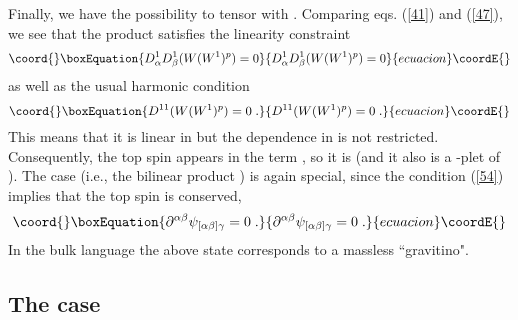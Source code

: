 \documentclass[a4paper,12pt]{article}
\begin{document}
Finally, we have the possibility to tensor \coordHE{} with \coordHE{}. 
Comparing eqs. (\ref{41}) and (\ref{47}), we see that the product 
\coordHE{} satisfies the linearity constraint
\begin{equation}\coord{}\boxEquation{\label{53}
  D^1_\alpha D^1_\beta (W(W^1)^p) =0
}{D^1_\alpha D^1_\beta (W(W^1)^p) =0
}{ecuacion}\coordE{}\end{equation}
as well as the usual harmonic condition
\begin{equation}\coord{}\boxEquation{\label{54}
  D^{11} (W(W^1)^p) =0\;.
}{D^{11} (W(W^1)^p) =0\;.
}{ecuacion}\coordE{}\end{equation}
This means that it is linear in \coordHE{} but the dependence in 
\coordHE{} is not restricted. Consequently, the top spin appears 
in the term \coordHE{}, so it is \coordHE{} (and it 
also is a \coordHE{}-plet of \coordHE{}). The case \coordHE{} (i.e., 
the bilinear product \coordHE{}) is again special, since the condition 
(\ref{54}) implies that the top spin is conserved, 
\begin{equation}\coord{}\boxEquation{\label{55}
  \partial^{\alpha\beta}\psi_{[\alpha\beta]\gamma} = 0\;.
}{\partial^{\alpha\beta}\psi_{[\alpha\beta]\gamma} = 0\;.
}{ecuacion}\coordE{}\end{equation}
In the bulk language the above state corresponds to a massless ``gravitino".


\subsection{The case \coordHE{}}
\end{document}

